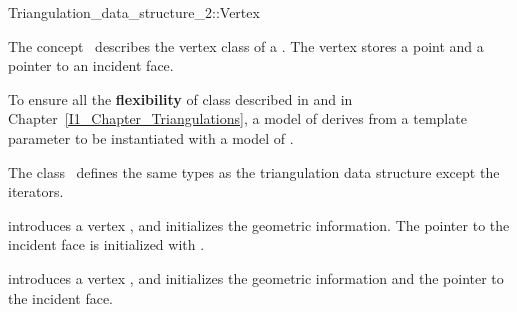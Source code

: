 

\begin{ccRefConcept}{Triangulation_data_structure_2::Vertex}


\ccDefinition
  
The concept \ccRefName\ describes the vertex class of a
.
The vertex stores a point and a pointer to an incident face.

To ensure all the \textbf{flexibility} of class 
described in 
and in Chapter~\ref{I1_Chapter_Triangulations}, a model of 
\ccRefName derives from a template parameter
 to be instantiated with a model of 
.


\ccTypes
The class \ccRefName\ defines the same types as 
the triangulation data structure 
except the iterators.


\begin{ccAdvanced}
\ccCreation
{}  %


{introduces a vertex \ccVar, and initializes the geometric information.
The pointer to the incident face is initialized with .}

{introduces a vertex \ccVar, and initializes the geometric information and 
the pointer to the incident face.}


\end{ccAdvanced}
\end{ccRefConcept}
